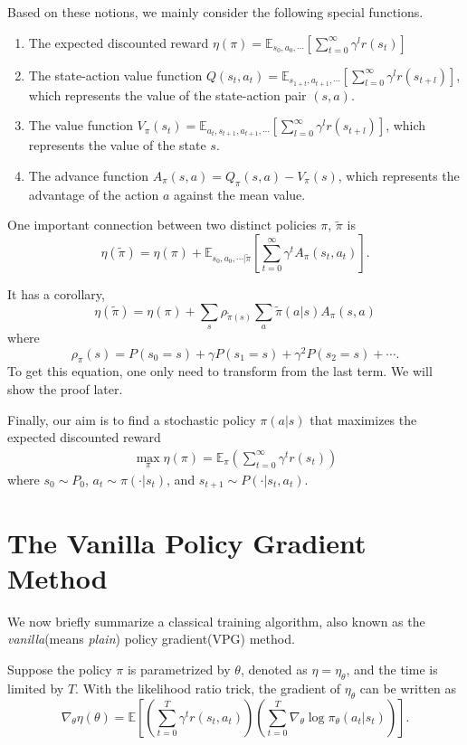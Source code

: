 Based on these notions, we mainly consider the following special functions.
\begin{enumerate}
\item
The expected discounted reward $\eta(\pi)=\mathbb{E}_{s_0, a_0, \cdots}\left[\sum_{t=0}^\infty \gamma^l r(s_t)\right]$
\item
The state-action value function $Q(s_t,a_t)=\mathbb{E}_{s_{1+t},a_{t+1},\cdots}[\sum_{l=0}^\infty\gamma^lr(s_{t+l})]$, which represents the value of the state-action pair $(s,a)$.
\item
The value function $V_{\pi}(s_t)=\mathbb{E}_{a_t,s_{t+1},a_{t+1},\cdots}[\sum_{l=0}^\infty\gamma^lr(s_{t+l})]$, which represents the value of the state $s$.
\item
The advance function $A_\pi(s,a)=Q_{\pi}(s,a)-V_\pi(s)$, which represents the advantage of the action $a$ against the mean value.
\end{enumerate}

One important connection between two distinct policies $\pi$, $\tilde\pi$ is
$$\eta(\tilde\pi)=\eta(\pi)+\mathbb{E}_{s_0,a_0,\cdots|\tilde\pi}[\sum_{t=0}^\infty\gamma^tA_\pi(s_t,a_t)].$$

It has a corollary,
$$ \eta(\tilde\pi)=\eta(\pi)+\sum_s\rho_{\tilde\pi(s)}\sum_a\tilde\pi(a|s)A_{\pi}(s,a)
$$
where
$$ \rho_\pi(s)=P(s_0=s)+\gamma P(s_1=s)+\gamma^2P(s_2=s)+\cdots.
$$
To get this equation, one only need to transform from the last term. We will show the proof later.

Finally, our aim is to find a stochastic policy $\pi(a|s)$ that maximizes the expected discounted reward 
\begin{align*}
\max_{\pi}\eta(\pi)=\mathbb{E}_{\pi}(\sum_{t=0}^{\infty}\gamma^{t}r(s_{t}))
\end{align*}
where $s_{0}\sim P_{0}$, $a_{t}\sim \pi(\cdot|s_{t})$, and $s_{t+1}\sim P(\cdot|s_{t},a_{t})$.

\section{The Vanilla Policy Gradient Method}
We  now briefly summarize a classical training algorithm, also known as the \emph{vanilla}(means \emph{plain}) policy gradient(VPG) method.

Suppose the policy $\pi$ is parametrized by $\theta$, denoted as $\eta=\eta_{\theta}$, and the time is limited by $T$. With the likelihood ratio trick, the gradient of $\eta_{\theta}$ can be written as
\[\nabla_{\theta}\eta(\theta)=\mathbb{E}\left[ \left(\sum_{t=0}^T \gamma^tr(s_t,a_t)\right)\left(\sum_{t=0}^T \nabla_{\theta}\log\pi_{\theta}(a_t|s_t)\right)  \right].\]

